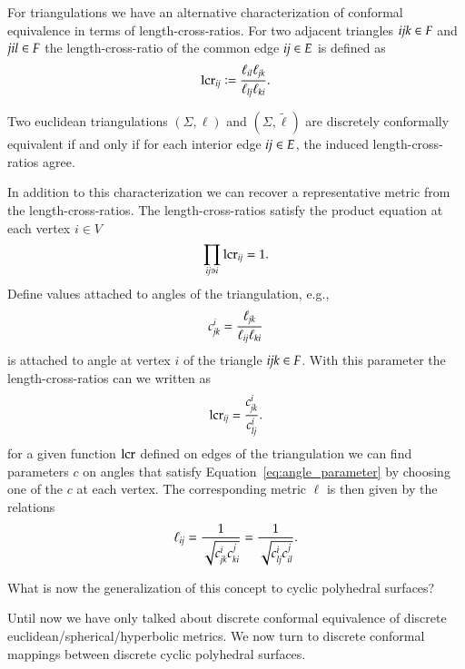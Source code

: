 \documentclass[Thesis]{subfiles}
\begin{document}
For triangulations we have an alternative characterization of conformal equivalence in terms of length-cross-ratios. For two adjacent triangles $\it ijk\in F$ and $\it jil\in F$ the length-cross-ratio of the common edge $\it ij\in E$ is defined as
\begin{equation}
\operatorname{lcr}_{\it ij}\vcentcolon=\frac{\ell_{\it il}\ell_{\it jk}}{\ell_{\it lj}\ell_{\it ki}}.
\end{equation}

\begin{proposition}
Two euclidean triangulations $(\Sigma, \ell)$ and $(\Sigma, \tilde \ell)$ are discretely conformally equivalent if and only if for each interior edge $\it ij\in E$, the induced length-cross-ratios agree.
\end{proposition}

In addition to this characterization we can recover a representative metric from the length-cross-ratios.
The length-cross-ratios satisfy the product equation at each vertex $i\in V$
\begin{equation}
\prod_{\it ij\ni i} \operatorname{lcr}_{\it ij} = 1.
\end{equation}
Define values attached to angles of the triangulation, e.g., 
\begin{equation}
c^i_{\it jk}=\frac{\ell_{\it jk}}{\ell_{\it ij}\ell_{\it ki}}\label{eq:angle_parameter}
\end{equation} 
is attached to angle at vertex $i$ of the triangle $\it ijk\in F$.
With this parameter the length-cross-ratios can we written as
\begin{equation}
\operatorname{lcr}_{\it ij}=\frac{c^i_{\it jk}}{c^i_{\it lj}}.
\end{equation}
for a given function $\operatorname{lcr}$ defined on edges of the triangulation we can find parameters $c$ on angles that satisfy Equation~\ref{eq:angle_parameter} by choosing one of the $c$ at each vertex.
The corresponding metric $\ell$ is then given by the relations
\begin{equation}
\ell_{\it ij} = \frac{1}{\sqrt{c^i_{\it jk}c^j_{\it ki}}} = \frac{1}{\sqrt{c^i_{\it lj}c^j_{\it il}}}.
\end{equation} 

What is now the generalization of this concept to cyclic polyhedral surfaces?



Until now we have only talked about discrete conformal equivalence of discrete euclidean/spherical/hyperbolic metrics.
We now turn to discrete conformal mappings between discrete cyclic polyhedral surfaces.
\end{document}
